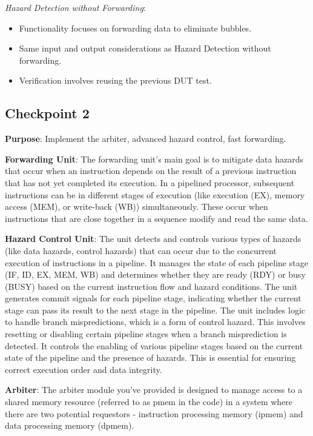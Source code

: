 \documentclass[12pt, a4paper]{article}
\begin{document}
    
    

    
    
\textit{Hazard Detection without Forwarding}:
\begin{itemize}
    \item Functionality focuses on forwarding data to eliminate bubbles.
    \item Same input and output considerations as Hazard Detection without forwarding.
    \item Verification involves reusing the previous DUT test.
\end{itemize}




    \subsection{Checkpoint 2}

    \textbf{Purpose}: Implement the arbiter, advanced hazard control, fast forwarding. 

    \textbf{Forwarding Unit}: The forwarding unit's main goal is to mitigate data hazards that occur when an instruction depends on the result of a previous instruction that has not yet completed its execution. In a pipelined processor, subsequent instructions can be in different stages of execution (like execution (EX), memory access (MEM), or write-back (WB)) simultaneously. These occur when instructions that are close together in a sequence modify and read the same data. 

    \textbf{Hazard Control Unit}: The unit detects and controls various types of hazards (like data hazards, control hazards) that can occur due to the concurrent execution of instructions in a pipeline. It manages the state of each pipeline stage (IF, ID, EX, MEM, WB) and determines whether they are ready (RDY) or busy (BUSY) based on the current instruction flow and hazard conditions. The unit generates commit signals for each pipeline stage, indicating whether the current stage can pass its result to the next stage in the pipeline. The unit includes logic to handle branch mispredictions, which is a form of control hazard. This involves resetting or disabling certain pipeline stages when a branch misprediction is detected. It controls the enabling of various pipeline stages based on the current state of the pipeline and the presence of hazards. This is essential for ensuring correct execution order and data integrity.

    \textbf{Arbiter}: The arbiter module you've provided is designed to manage access to a shared memory resource (referred to as pmem in the code) in a system where there are two potential requestors - instruction processing memory (ipmem) and data processing memory (dpmem). 
\end{document}
